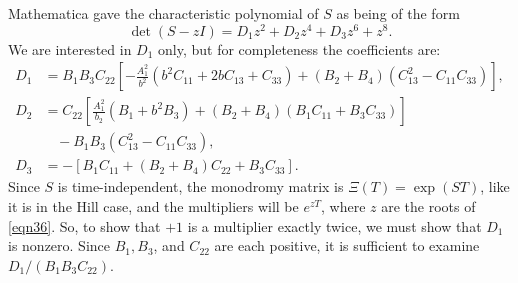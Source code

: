\documentclass[12pt]{article}
\begin{document}
Mathematica gave the characteristic polynomial of $S$ as being of the form
\begin{equation}\label{eqn36}
\det(S - zI) = D_1z^2 + D_2z^4 + D_3z^6 + z^8.
\end{equation}
We are interested in $D_1$ only, but for completeness the coefficients are:
\begin{equation}\label{eqnDs}
\begin{aligned}
D_1 & = B_1B_3C_{22}\left[-\frac{A_1^2}{b^2}\left(b^2C_{11} + 2bC_{13} + C_{33}\right) + (B_2 + B_4)\left(C_{13}^2 - C_{11}C_{33}\right)\right], \\
D_2 & = C_{22}\left[\frac{A_1^2}{b_2}\left(B_1 + b^2B_3\right) + (B_2 + B_4)(B_1C_{11} + B_3C_{33})\right]\\
& \ \ \ \ - B_1B_3\left(C_{13}^2 - C_{11}C_{33}\right), \\
D_3 & = -\left[B_1C_{11} + (B_2 + B_4)C_{22} + B_3C_{33}\right].
\end{aligned}
\end{equation}
Since $S$ is time-independent, the monodromy matrix is $\Xi(T) = \exp(ST)$, like it is in the Hill case, and the multipliers will be $e^{zT}$, where $z$ are the roots of \eqref{eqn36}. So, to show that $+1$ is a multiplier exactly twice, we must show that $D_1$ is nonzero. Since $B_1, B_3$, and $C_{22}$ are each positive, it is sufficient to examine $D_1/(B_1B_3C_{22})$.
\end{document}
